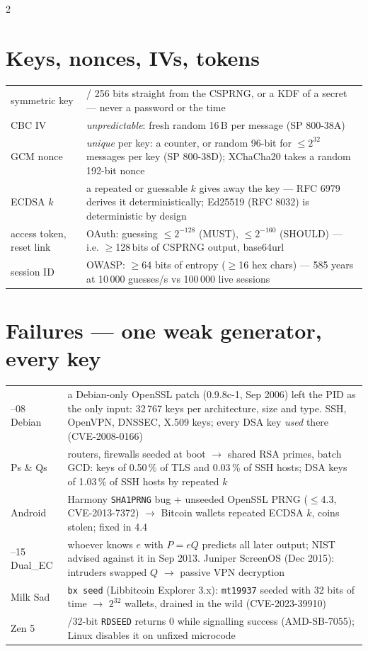 \documentclass[8pt]{extarticle}
\newcommand\ct[1]{\texttt{#1}}
\begin{document}
\begin{multicols}{2}
\section{Keys, nonces, IVs, tokens}
{\scriptsize\setlength\tabcolsep{2.5pt}
\begin{tabular}{@{}>{\raggedright\arraybackslash}p{15mm}>{\raggedright\arraybackslash}p{63mm}@{}}
\toprule
symmetric key & 128 / 256 bits straight from the CSPRNG, or a KDF of a secret — never a password or the time\\
CBC IV & \emph{unpredictable}: fresh random 16\,B per message (SP 800-38A)\\
GCM nonce & \emph{unique} per key: a counter, or random 96-bit for $\le 2^{32}$ messages per key (SP 800-38D); XChaCha20 takes a random 192-bit nonce\\
ECDSA $k$ & a repeated or guessable $k$ gives away the key — RFC 6979 derives it deterministically; Ed25519 (RFC 8032) is deterministic by design\\
access token, reset link & OAuth: guessing $\le 2^{-128}$ (MUST), $\le 2^{-160}$ (SHOULD) — i.e. $\ge$128\,bits of CSPRNG output, base64url\\
session ID & OWASP: $\ge$64 bits of entropy ($\ge$16 hex chars) — 585 years at 10\,000 guesses/s vs 100\,000 live sessions\\
\bottomrule
\end{tabular}}

\section{Failures — one weak generator, every key}
{\scriptsize\setlength\tabcolsep{2.5pt}
\begin{tabular}{@{}>{\raggedright\arraybackslash}p{13mm}>{\raggedright\arraybackslash}p{65mm}@{}}
\toprule
2006–08 Debian & a Debian-only OpenSSL patch (0.9.8c-1, Sep 2006) left the PID as the only input: 32\,767 keys per architecture, size and type. SSH, OpenVPN, DNSSEC, X.509 keys; every DSA key \emph{used} there (CVE-2008-0166)\\
2012 Ps \& Qs & routers, firewalls seeded at boot $\to$ shared RSA primes, batch GCD: keys of 0.50\,\% of TLS and 0.03\,\% of SSH hosts; DSA keys of 1.03\,\% of SSH hosts by repeated $k$\\
2013 Android & Harmony \ct{SHA1PRNG} bug + unseeded OpenSSL PRNG ($\le$4.3, CVE-2013-7372) $\to$ Bitcoin wallets repeated ECDSA $k$, coins stolen; fixed in 4.4\\
2013–15 Dual\_EC & whoever knows $e$ with $P = eQ$ predicts all later output; NIST advised against it in Sep 2013. Juniper ScreenOS (Dec 2015): intruders swapped $Q$ $\to$ passive VPN decryption\\
2023 Milk Sad & \ct{bx seed} (Libbitcoin Explorer 3.x): \ct{mt19937} seeded with 32 bits of time $\to$ $2^{32}$ wallets, drained in the wild (CVE-2023-39910)\\
2025 Zen 5 & 16/32-bit \ct{RDSEED} returns 0 while signalling success (AMD-SB-7055); Linux disables it on unfixed microcode\\
\bottomrule
\end{tabular}}


\end{multicols}
\end{document}
